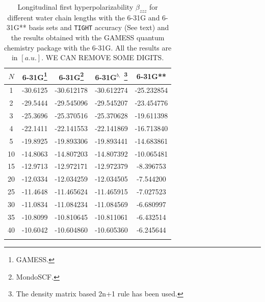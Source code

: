 \documentclass[prl,aps,twocolumn,showpacs,twocolumngrid,superbib]{revtex4}
\begin{document}
\begin{table}
  \centering
  \caption{\protect
    Longitudinal first hyperpolarizability $\beta_{zzz}$
    for different water chain lengths with the 6-31G and 6-31G** basis sets
    and {\tt TIGHT} accuracy (See text) and the results obtained with
    the GAMESS quantum chemistry package \cite{gamess} with the 6-31G. 
    All the results are in $[a.u.]$.
    WE CAN REMOVE SOME DIGITS.
  }\label{tab:Beta_1D_Values}
  \begin{tabular}{ccccc}
    \toprule
    $N$ &\multicolumn{1}{c}{6-31G\footnote[1]{\sc GAMESS.}}
    &\multicolumn{1}{c}{6-31G\footnote[2]{\sc MondoSCF.}}
    &\multicolumn{1}{c}{6-31G$^{b,}$
      \footnote[3]{The density matrix based 2n+1 rule has been used.}}
    &\multicolumn{1}{c}{6-31G**}$^b$ \\
    \hline
     1 & -30.6125 & -30.612178 & -30.612274 & -25.232854 \\
     2 & -29.5444 & -29.545096 & -29.545207 & -23.454776 \\
     3 & -25.3696 & -25.370516 & -25.370628 & -19.611398 \\
     4 & -22.1411 & -22.141553 & -22.141869 & -16.713840 \\
     5 & -19.8925 & -19.893306 & -19.893441 & -14.683861 \\
    10 & -14.8063 & -14.807203 & -14.807392 & -10.065481 \\
    15 & -12.9713 & -12.972171 & -12.972379 &  -8.396753 \\
    20 & -12.0334 & -12.034259 & -12.034505 &  -7.544200 \\
    25 & -11.4648 & -11.465624 & -11.465915 &  -7.027523 \\
    30 & -11.0834 & -11.084234 & -11.084569 &  -6.680997 \\
    35 & -10.8099 & -10.810645 & -10.811061 &  -6.432514 \\
    40 & -10.6042 & -10.604860 & -10.605360 &  -6.245644 \\
    \botrule
  \end{tabular}
\end{table}
\end{document}
